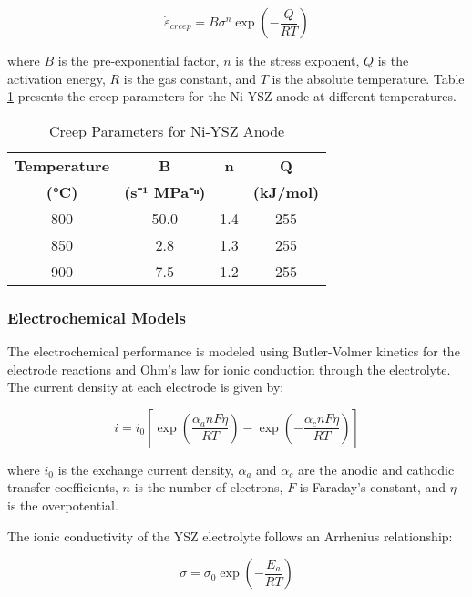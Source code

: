 \documentclass[conference]{IEEEtran}
\begin{document}
\begin{equation}
\dot{\varepsilon}_{creep} = B\sigma^n \exp\left(-\frac{Q}{RT}\right)
\end{equation}

where $B$ is the pre-exponential factor, $n$ is the stress exponent, $Q$ is the activation energy, $R$ is the gas constant, and $T$ is the absolute temperature. Table \ref{tab:creep} presents the creep parameters for the Ni-YSZ anode at different temperatures.

\begin{table}[H]
\centering
\caption{Creep Parameters for Ni-YSZ Anode}
\label{tab:creep}
\begin{tabular}{@{}cccc@{}}
\toprule
\textbf{Temperature} & \textbf{B} & \textbf{n} & \textbf{Q} \\
\textbf{(°C)} & \textbf{(s⁻¹ MPa⁻ⁿ)} & & \textbf{(kJ/mol)} \\
\midrule
800 & 50.0 & 1.4 & 255 \\
850 & 2.8 & 1.3 & 255 \\
900 & 7.5 & 1.2 & 255 \\
\bottomrule
\end{tabular}
\end{table}

\subsubsection{Electrochemical Models}

The electrochemical performance is modeled using Butler-Volmer kinetics for the electrode reactions and Ohm's law for ionic conduction through the electrolyte. The current density at each electrode is given by:

\begin{equation}
i = i_0 \left[\exp\left(\frac{\alpha_a nF\eta}{RT}\right) - \exp\left(-\frac{\alpha_c nF\eta}{RT}\right)\right]
\end{equation}

where $i_0$ is the exchange current density, $\alpha_a$ and $\alpha_c$ are the anodic and cathodic transfer coefficients, $n$ is the number of electrons, $F$ is Faraday's constant, and $\eta$ is the overpotential.

The ionic conductivity of the YSZ electrolyte follows an Arrhenius relationship:

\begin{equation}
\sigma = \sigma_0 \exp\left(-\frac{E_a}{RT}\right)
\end{equation}
\end{document}
